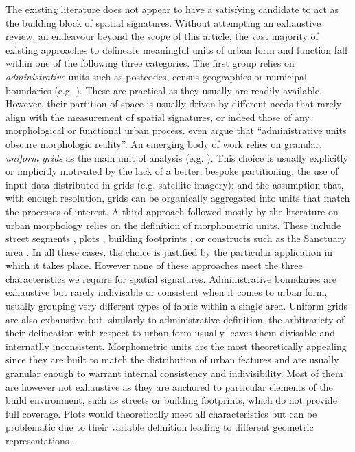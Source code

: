 The existing literature does not appear to have a satisfying candidate to act as
the building block of spatial signatures.
%
Without attempting an exhaustive review, an endeavour beyond the scope of this
article, the vast majority of existing approaches to delineate meaningful units
of urban form and function fall within one of the following three categories.
The first group relies on \textit{administrative} units such as postcodes,
census geographies or municipal boundaries (e.g. \citealp{taubenbock2020}).
%
These are practical as they usually are readily
available. However, their partition of space is usually driven by different
needs that rarely align with the measurement of spatial signatures, or indeed
those of any morphological or functional urban process.
\cite{taubenbock2019new} even argue that
``administrative units obscure morphologic reality''.
An emerging body of work relies on granular, \textit{uniform grids} as the main
unit of analysis (e.g. \citealp{jochem2020}). This choice is usually explicitly or implicitly motivated
by the lack of a better, bespoke partitioning; the use of input data distributed
in grids (e.g. satellite imagery); and the assumption that, with enough
resolution, grids can be organically aggregated into units that match the
processes of interest.
A third approach followed mostly by the literature on urban morphology relies on
the definition of morphometric units. These include street segments
\citep{araldi2019}, plots \citep{bobkova2019}, building footprints
\citep{schirmer2015}, or constructs such as the Sanctuary area
\citep{mehaffy2010urban,dibble2019origin}.
In all these cases, the
choice is justified by the particular application in which it takes place.
However none of these approaches meet the three characteristics we require for
spatial signatures.
%
Administrative boundaries are exhaustive but rarely indivisable or consistent
when it comes to urban form, usually grouping very different types of fabric
within a single area.
%
Uniform grids are also exhaustive but, similarly to administrative definition,
the arbitrariety of their delineation with respect to urban form usually leaves
them divisable and internatlly inconsistent.
%
Morphometric units are the most theoretically appealing since they are built to
match the distribution of urban features and are usually granular enough to
warrant internal consistency and indivisibility. Most of them are however not
exhaustive as they are anchored to particular elements of the build environment,
such as streets or building footprints, which do not provide full coverage.
Plots would theoretically meet all characteristics but can be problematic due to
their variable definition leading to different geometric representations
\citep{kropf2018plots}.

